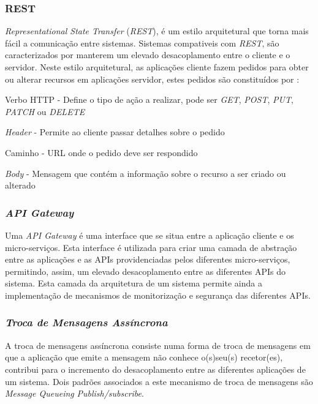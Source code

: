 \subsubsection{REST}
\emph{Representational State Transfer} (\emph{REST}), é um estilo arquitetural que torna mais fácil a comunicação entre sistemas. Sistemas compativeis com \emph{REST}, são caracterizados por manterem um elevado desacoplamento entre o cliente e o servidor.
Neste estilo arquitetural, as aplicações cliente fazem pedidos para obter ou alterar recursos em aplicações servidor, estes pedidos são constituídos por \cite{rest}:
\begin{description}
    \item Verbo HTTP - Define o tipo de ação a realizar, pode ser \emph{GET}, \emph{POST}, \emph{PUT}, \emph{PATCH} ou \emph{DELETE}
    \item \emph{Header} - Permite ao cliente passar detalhes sobre o pedido
    \item Caminho - URL onde o pedido deve ser respondido
    \item \emph{Body} - Mensagem que contém a informação sobre o recurso a ser criado ou alterado
\end{description}

\subsubsection{\emph{API Gateway}} \label{api_gateway}
Uma \emph{API Gateway} é uma interface que se situa entre a aplicação cliente e os micro-serviços. Esta interface é utilizada para criar uma camada de abstração entre as aplicações e as APIs providenciadas pelos diferentes micro-serviços, permitindo, assim, um elevado desacoplamento entre as diferentes APIs do sistema.
Esta camada da arquitetura de um sistema permite ainda a implementação de mecanismos de monitorização e segurança das diferentes APIs.

\subsubsection{\emph{Troca de Mensagens Assíncrona}} \label{troca_mensagens_assincrona}
A troca de mensagens assíncrona consiste numa forma de troca de mensagens em que a aplicação que emite a mensagem não conhece o(s)seu(s) recetor(es), contribui para o incremento do desacoplamento entre as diferentes aplicações de um sistema.
Dois padrões associados a este mecanismo de troca de mensagens são \emph{Message Queueing} \emph{Publish/subscribe}.

